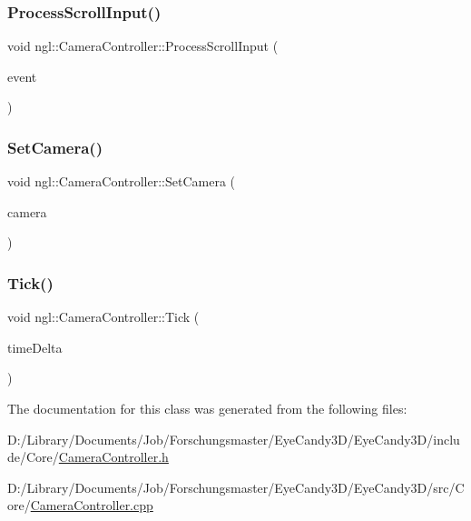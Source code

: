 \subsubsection{\texorpdfstring{Process\+Scroll\+Input()}{ProcessScrollInput()}}
{\footnotesize\ttfamily void ngl\+::\+Camera\+Controller\+::\+Process\+Scroll\+Input (\begin{DoxyParamCaption}\item[{const \mbox{\hyperlink{structngl_1_1_mouse_scroll_event}{Mouse\+Scroll\+Event}} \&}]{event }\end{DoxyParamCaption})\hspace{0.3cm}{\ttfamily [protected]}}

\mbox{\label{classngl_1_1_camera_controller_a0f8ab271aa07607d0a4f8930d38bf97f}} 
\subsubsection{\texorpdfstring{Set\+Camera()}{SetCamera()}}
{\footnotesize\ttfamily void ngl\+::\+Camera\+Controller\+::\+Set\+Camera (\begin{DoxyParamCaption}\item[{const \mbox{\hyperlink{classngl_1_1_camera}{Camera}}}]{camera }\end{DoxyParamCaption})}

\mbox{\label{classngl_1_1_camera_controller_a9f03cb3867665cd2dd5a6b2840acc09d}} 
\subsubsection{\texorpdfstring{Tick()}{Tick()}}
{\footnotesize\ttfamily void ngl\+::\+Camera\+Controller\+::\+Tick (\begin{DoxyParamCaption}\item[{const float}]{time\+Delta }\end{DoxyParamCaption})}



The documentation for this class was generated from the following files\+:\begin{DoxyCompactItemize}
\item 
D\+:/\+Library/\+Documents/\+Job/\+Forschungsmaster/\+Eye\+Candy3\+D/\+Eye\+Candy3\+D/include/\+Core/\mbox{\hyperlink{_camera_controller_8h}{Camera\+Controller.\+h}}\item 
D\+:/\+Library/\+Documents/\+Job/\+Forschungsmaster/\+Eye\+Candy3\+D/\+Eye\+Candy3\+D/src/\+Core/\mbox{\hyperlink{_camera_controller_8cpp}{Camera\+Controller.\+cpp}}\end{DoxyCompactItemize}
